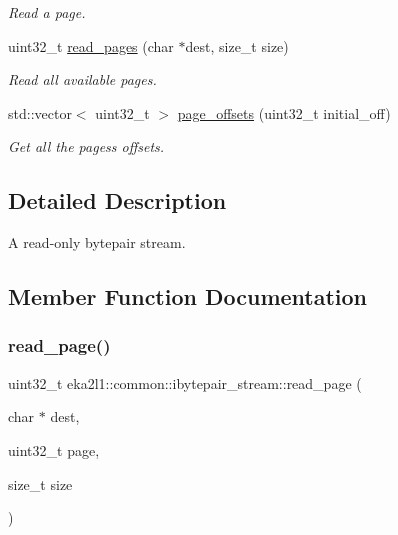 \begin{DoxyCompactItemize}
\begin{DoxyCompactList}\small\item\em Read a page. \end{DoxyCompactList}\item 
uint32\+\_\+t \mbox{\hyperlink{classeka2l1_1_1common_1_1ibytepair__stream_adab55d51034ac5e7b2c2ca4c363725de}{read\+\_\+pages}} (char $\ast$dest, size\+\_\+t size)
\begin{DoxyCompactList}\small\item\em Read all available pages. \end{DoxyCompactList}\item 
\mbox{\label{classeka2l1_1_1common_1_1ibytepair__stream_ad34d0ded1f693722f386f5cc1b838d3d}} 
std\+::vector$<$ uint32\+\_\+t $>$ \mbox{\hyperlink{classeka2l1_1_1common_1_1ibytepair__stream_ad34d0ded1f693722f386f5cc1b838d3d}{page\+\_\+offsets}} (uint32\+\_\+t initial\+\_\+off)
\begin{DoxyCompactList}\small\item\em Get all the pages\textquotesingle{}s offsets. \end{DoxyCompactList}\end{DoxyCompactItemize}


\subsection{Detailed Description}
A read-\/only bytepair stream. 

\subsection{Member Function Documentation}
\mbox{\label{classeka2l1_1_1common_1_1ibytepair__stream_ac6d986066799b2aece89b96cb5c00ce7}} 
\subsubsection{\texorpdfstring{read\+\_\+page()}{read\_page()}}
{\footnotesize\ttfamily uint32\+\_\+t eka2l1\+::common\+::ibytepair\+\_\+stream\+::read\+\_\+page (\begin{DoxyParamCaption}\item[{char $\ast$}]{dest,  }\item[{uint32\+\_\+t}]{page,  }\item[{size\+\_\+t}]{size }\end{DoxyParamCaption})}



